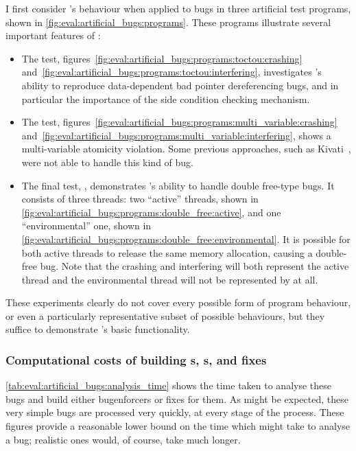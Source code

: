 \noindent
I first consider {\implementation}'s behaviour when applied to bugs in
three artificial test programs, shown in
\autoref{fig:eval:artificial_bugs:programs}.  These programs
illustrate several important features of {\technique}:
\begin{itemize}
  \item The  test,
    figures~\ref{fig:eval:artificial_bugs:programs:toctou:crashing}
    and~\ref{fig:eval:artificial_bugs:programs:toctou:interfering},
    investigates {\implementation}'s ability to reproduce data-dependent
    bad pointer dereferencing bugs, and in particular the importance
    of the side condition checking mechanism.
  \item The  test,
    figures~\ref{fig:eval:artificial_bugs:programs:multi_variable:crashing}
    and~\ref{fig:eval:artificial_bugs:programs:multi_variable:interfering},
    shows a multi-variable atomicity violation.  Some previous
    approaches, such as Kivati~\cite{Chew2010}, were not able to handle
    this kind of bug.
  \item The final test, , demonstrates
    {\implementation}'s ability to handle double free-type bugs.  It
    consists of three threads: two ``active'' threads, shown in
    \autoref{fig:eval:artificial_bugs:programs:double_free:active},
    and one ``environmental'' one, shown in
    \autoref{fig:eval:artificial_bugs:programs:double_free:environmental}.
    It is possible for both active threads to release the same memory
    allocation, causing a double-free bug.  Note that the crashing and
    interfering {\StateMachines} will both represent the active thread
    and the environmental thread will not be represented by
    {\AStateMachine} at all.
\end{itemize}
These experiments clearly do not cover every possible form of program
behaviour, or even a particularly representative subset of possible
behaviours, but they suffice to demonstrate {\technique}'s basic
functionality.

\subsubsection{Computational costs of building s, s, and fixes}

\autoref{tab:eval:artificial_bugs:analysis_time} shows the time taken
to analyse these bugs and build either \glspl{bugenforcer} or fixes
for them.  As might be expected, these very simple bugs are processed
very quickly, at every stage of the process.  These figures provide a
reasonable lower bound on the time which {\implementation} might take to
analyse a bug; realistic ones would, of course, take much longer.

